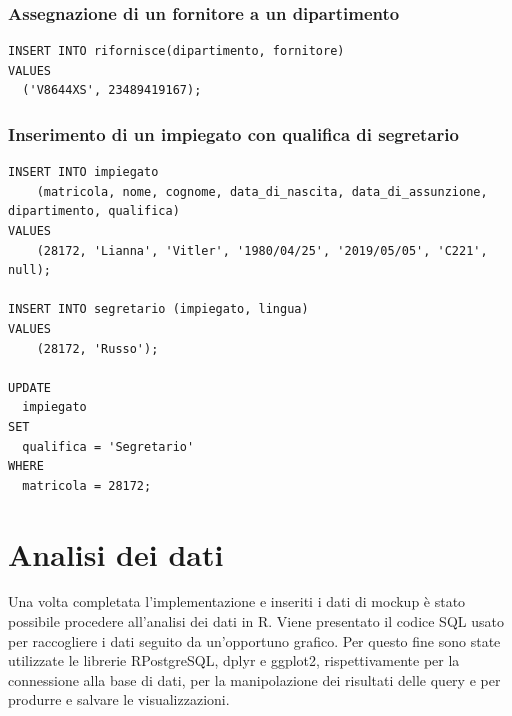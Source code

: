\documentclass{article}
\begin{document}
\subsubsection{Assegnazione di un fornitore a un dipartimento}
\begin{verbatim}
INSERT INTO rifornisce(dipartimento, fornitore) 
VALUES 
  ('V8644XS', 23489419167);
\end{verbatim}

\subsubsection{Inserimento di un impiegato con qualifica di segretario} %
\begin{verbatim}
INSERT INTO impiegato 
    (matricola, nome, cognome, data_di_nascita, data_di_assunzione, dipartimento, qualifica) 
VALUES 
	(28172, 'Lianna', 'Vitler', '1980/04/25', '2019/05/05', 'C221', null);

INSERT INTO segretario (impiegato, lingua) 
VALUES 
	(28172, 'Russo');

UPDATE 
  impiegato 
SET 
  qualifica = 'Segretario' 
WHERE 
  matricola = 28172;
\end{verbatim}

\newpage

\section{Analisi dei dati}
Una volta completata l'implementazione e inseriti i dati di mockup è stato possibile procedere all'analisi dei dati in R. Viene presentato il codice SQL usato per raccogliere i dati seguito da un'opportuno grafico.
\newline
\newline
Per questo fine sono state utilizzate le librerie RPostgreSQL, dplyr e ggplot2, rispettivamente per la connessione alla base di dati, per la manipolazione dei risultati delle query e per produrre e salvare le visualizzazioni.
\end{document}
